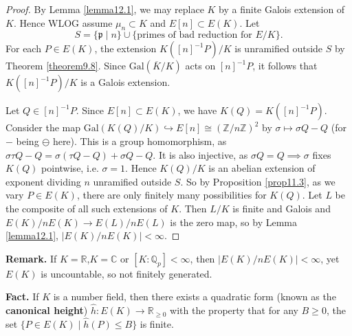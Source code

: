 \documentclass{article}
\theoremstyle{definition}
\begin{document}
\begin{proof}
    By Lemma \ref{lemma12.1}, we may replace $K$ by a finite Galois extension of $K$. Hence WLOG assume $\mu_n \subset K$ and $E[n] \subset E(K)$. Let $$S = \{\mathfrak{p} \mid  n\} \cup \{\text{primes of bad reduction for }E/K\}.$$ For each $P \in E(K)$, the extension $K([n]^{-1}P)/K$ is unramified outside $S$ by Theorem \ref{theorem9.8}. Since $\text{Gal}(\overline{K}/K)$ acts on $[n]^{-1}P$, it follows that $K([n]^{-1}P)/K$ is a Galois extension.
    \vspace{1mm}
     
    Let $Q \in [n]^{-1}P$. Since $E[n] \subset E(K)$, we have $K(Q) = K([n]^{-1}P)$. Consider the map $\text{Gal}(K(Q)/K) \hookrightarrow E[n] \cong (\mathbb{Z}/n\mathbb{Z})^2$ by $\sigma \mapsto \sigma Q-Q$ (for $-$ being $\ominus$ here). This is a group homomorphism, as $\sigma \tau Q - Q = \sigma(\tau Q - Q)+ \sigma Q - Q$. It is also injective, as $\sigma Q = Q \implies \sigma$ fixes $K(Q)$ pointwise, i.e. $\sigma=1$. Hence $K(Q)/K$ is an abelian extension of exponent dividing $n$ unramified outside $S$. So by Proposition \ref{prop11.3}, as we vary $P \in E(K)$, there are only finitely many possibilities for $K(Q)$. Let $L$ be the composite of all such extensions of $K$. Then $L/K$ is finite and Galois and $E(K)/nE(K) \to E(L)/nE(L)$ is the zero map, so by Lemma \ref{lemma12.1}, $\left|E(K)/nE(K)\right|<\infty$.
\end{proof}
\textbf{Remark.} If $K=\mathbb{R}$,$K = \mathbb{C}$ or $[K:\mathbb{Q}_p]<\infty$, then $\left|E(K)/nE(K)\right|<\infty$, yet $E(K)$ is uncountable, so not finitely generated.
\vspace{1mm}
 
\textbf{Fact.} If $K$ is a number field, then there exists a quadratic form (known as the \textbf{canonical height}) $\widehat{h}: E(K) \to \mathbb{R}_{\ge 0}$ with the property that for any $B\ge 0$, the set $\{P \in E(K) \mid \widehat{h}(P)\le B\}$ is finite.
\end{document}
